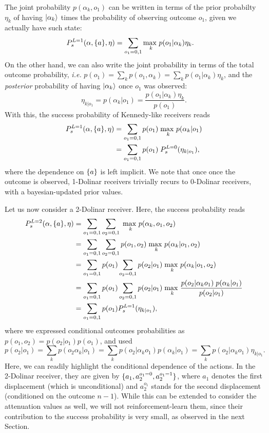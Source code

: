 The joint probability $p(\alpha_k, o_1)$ can be written in terms of the prior probabilty $\eta_k$ of having $\ket{\alpha_k}$ times the probability of observing outcome $o_1$, given we actually have such state:
\begin{align}\label{eq:1dol_eta}
P_s^{L=1}(\alpha, \lbrace a\rbrace, \eta) &=\sum_{o_1 = 0,1} \underset{k}{\text{max }} p(o_1 | \alpha_k) \eta_k.
\end{align}
On the other hand, we can also write the joint probability in terms of the total outcome probability, \textit{i.e.} $p(o_1) = \sum_{k} p(o_1, \alpha_k ) = \sum_{k} p(o_1|\alpha_k ) \eta_k$, and the \textit{posterior} probability of having $\ket{\alpha_k}$ once $o_1$ was observed:
\begin{equation}\label{eq:rlcoh_bayes_prior}
\eta_{k|o_1} = p(\alpha_k | o_1) = \frac{p(o_1|\alpha_k ) \eta_k}{p(o_1)}.
\end{equation}
With this, the success probability of Kennedy-like receivers reads
\begin{align}\label{eq:1dol_post}
P_s^{L=1}(\alpha, \lbrace a\rbrace, \eta) &=\sum_{o_1 = 0,1} p(o_1)\;\underset{k}{\text{max }} p(\alpha_k| o_1) \\
&=\sum_{o_1 = 0,1} p(o_1) \;P_s^{L=0}(\eta_{k|o_1}),
\end{align}
where the dependence on $\lbrace a\rbrace$ is left implicit. We note that once once the outcome is observed, 1-Dolinar receivers trivially recurs to 0-Dolinar receivers, with a bayesian-updated prior values.

Let us now consider a 2-Dolinar receiver. Here, the success probability reads
\begin{align}\label{eq:2dol}
P_s^{L=2}(\alpha, \lbrace a\rbrace, \eta) &=\sum_{o_1 = 0,1}\sum_{o_2 = 0,1} \;\underset{k}{\text{max }} p(\alpha_k, o_1, o_2) \\
&=\sum_{o_1 = 0,1}\sum_{o_2 = 0,1} p(o_1, o_2)\;\underset{k}{\text{max }} p(\alpha_k|o_1, o_2 )\\
&=\sum_{o_1 = 0,1} p(o_1) \sum_{o_2 = 0,1} p(o_2|o_1)\;\underset{k}{\text{max }} p(\alpha_k|o_1, o_2 )\\
&=\sum_{o_1 = 0,1} p(o_1) \sum_{o_2 = 0,1} p(o_2|o_1)\;\underset{k}{\text{max }} \frac{p(o_2| \alpha_k o_1) \;p(\alpha_k|o_1)}{p(o_2|o_1)}\\
&=\sum_{o_1 = 0,1} p(o_1) P_s^{L=1}(\eta_{k|o_1}),
\end{align}
where we expressed conditional outcomes probabilities as $p(o_1, o_2) = p(o_2|o_1)p(o_1)$, and used
\begin{equation}\label{eq:depend}
p(o_2|o_1) = \sum_{k}p(o_2 \alpha_k|o_1) = \sum_k p(o_2|\alpha_k o_1) p(\alpha_k|o_1) = \sum_k p(o_2|\alpha_k o_1) \eta_{k|o_1}.
\end{equation}
Here, we can readily highlight the conditional dependence of the actions. In the 2-Dolinar receiver, they are given by $\lbrace a_1, a_2^{o_1=0}, a_2^{o_1=1}\rbrace$, where $a_1$ denotes the first displacement (which is unconditional) and $a_2^{o_1}$ stands for the second displacement (conditioned on the outcome $n-1$). While this can be extended to consider the attenuation values as well, we will not reinforcement-learn them, since their contribution to the success probability is very small, as observed in the next Section.

